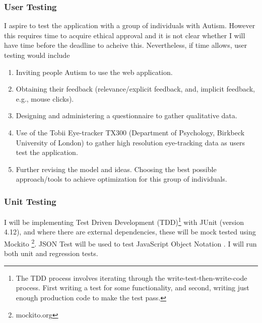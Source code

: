 \documentclass[a4paper, 10pt]{article}
\begin{document}
\subsubsection{User Testing}
I aspire to test the application with a group of individuals with Autism. However this requires time to acquire ethical approval and it is not clear whether I will have time before the deadline to acheive this. Nevertheless, if time allows, user testing would include
\begin{enumerate}
\item Inviting people Autism to use the web application.
\item Obtaining their feedback (relevance/explicit feedback, and, implicit feedback, e.g., mouse clicks). 
\item Designing and administering a questionnaire to gather qualitative data. 
\item Use of the Tobii Eye-tracker TX300 (Department of Psychology, Birkbeck University of London) to gather high resolution eye-tracking data as users test the application. 
\item Further revising the model and ideas. Choosing the best possible approach/tools to achieve optimization for this group of individuals.
\end{enumerate}

\subsubsection{Unit Testing}
I will be implementing Test Driven Development (TDD)\footnote{The TDD process involves iterating through the write-test-then-write-code process. First writing a test for some functionality, and second, writing just enough production code to make the test pass.} with JUnit (version 4.12), and where there are external dependencies, these will be mock tested using Mockito \footnote{mockito.org}. JSON Test will be used to test JavaScript Object Notation \cite{jsontest}. I will run both unit and regression tests.
\end{document}
